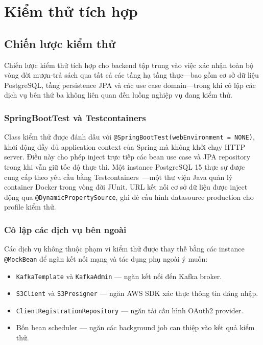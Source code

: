 \section{Kiểm thử tích hợp}

\subsection{Chiến lược kiểm thử}

Chiến lược kiểm thử tích hợp cho backend tập trung vào việc xác nhận toàn bộ
vòng đời mượn-trả sách qua tất cả các tầng hạ tầng thực---bao gồm cơ sở dữ liệu
PostgreSQL, tầng persistence JPA và các use case domain---trong khi cô lập các
dịch vụ bên thứ ba không liên quan đến luồng nghiệp vụ đang kiểm thử.

\subsubsection{SpringBootTest và Testcontainers}
Class kiểm thử được đánh dấu với \texttt{@SpringBootTest(webEnvironment = NONE)},
khởi động đầy đủ application context của Spring mà không khởi chạy HTTP server.
Điều này cho phép inject trực tiếp các bean use case và JPA repository trong khi
vẫn giữ tốc độ thực thi. Một instance PostgreSQL 15 thực sự được cung cấp theo
yêu cầu bằng Testcontainers~\cite{testcontainers}---một thư viện Java quản lý
container Docker trong vòng đời JUnit. URL kết nối cơ sở dữ liệu được inject động
qua \texttt{@DynamicPropertySource}, ghi đè cấu hình datasource production cho
profile kiểm thử.

\subsubsection{Cô lập các dịch vụ bên ngoài}
Các dịch vụ không thuộc phạm vi kiểm thử được thay thế bằng các instance
\texttt{@MockBean} để ngăn kết nối mạng và tác dụng phụ ngoài ý muốn:

\begin{itemize}
    \item \texttt{KafkaTemplate} và \texttt{KafkaAdmin} --- ngăn kết nối đến
          Kafka broker.
    \item \texttt{S3Client} và \texttt{S3Presigner} --- ngăn AWS SDK xác thực
          thông tin đăng nhập.
    \item \texttt{ClientRegistrationRepository} --- ngăn tải cấu hình OAuth2
          provider.
    \item Bốn bean scheduler --- ngăn các background job can thiệp vào kết quả
          kiểm thử.
\end{itemize}

